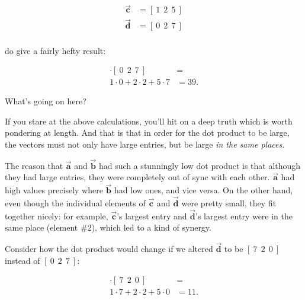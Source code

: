 \vspace{-.15in}
\begin{align*}
\overrightarrow{\textbf{c}} &= [\ 1\ \ 2\ \ 5\ ] \\
\overrightarrow{\textbf{d}} &= [\ 0\ \ 2\ \ 7\ ] \\
\end{align*}
\vspace{-.15in}

do give a fairly hefty result:

\vspace{-.15in}
\begin{align*}
[\ 1\ \ 2\ \ 5\ ] \cdot [\ 0\ \ 2\ \ 7\ ] &= \\
1 \cdot 0 + 2 \cdot 2 + 5 \cdot 7 &= 39.
\end{align*}
\vspace{-.15in}

What's going on here?

\medskip

If you stare at the above calculations, you'll hit on a deep truth which is
worth pondering at length. And that is that in order for the dot product to be
large, the vectors must not only have large entries, but be large \textit{in
the same places.}

The reason that $\overrightarrow{\textbf{a}}$ and $\overrightarrow{\textbf{b}}$
had such a stunningly low dot product is that although they had large entries,
they were completely out of sync with each other. $\overrightarrow{\textbf{a}}$
had high values precisely where $\overrightarrow{\textbf{b}}$ had low ones, and
vice versa. On the other hand, even though the individual elements of
$\overrightarrow{\textbf{c}}$ and  $\overrightarrow{\textbf{d}}$ were pretty
small, they fit together nicely: for example, $\overrightarrow{\textbf{c}}$'s
largest entry and $\overrightarrow{\textbf{d}}$'s largest entry were in the
same place (element \#2), which led to a kind of synergy.

Consider how the dot product would change if we altered
$\overrightarrow{\textbf{d}}$ to be $[\ 7\ \ 2\ \ 0\ ]$ instead of $[\ 0\ \ 2\
\ 7\ ]$:

\vspace{-.15in}
\begin{align*}
[\ 1\ \ 2\ \ 5\ ] \cdot [\ 7\ \ 2\ \ 0\ ] &= \\
1 \cdot 7 + 2 \cdot 2 + 5 \cdot 0 &= 11.
\end{align*}
\vspace{-.15in}

